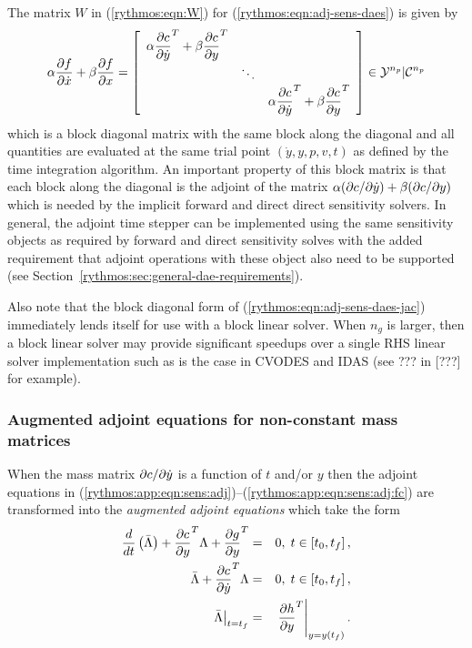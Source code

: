 \documentclass[pdf,ps2pdf,11pt]{SANDreport}
\begin{document}
The matrix $W$ in (\ref{rythmos:eqn:W}) for
(\ref{rythmos:eqn:adj-sens-daes}) is given by
%
\begin{equation}
\alpha \Jac{f}{\dot{x}} + \beta \Jac{f}{x}
= 
{\bmat{ccc}
\alpha \Jac{c}{\dot{y}}^T + \beta \Jac{c}{y}^T \\
& \ddots \\
& & \alpha \Jac{c}{\dot{y}}^T + \beta \Jac{c}{y}^T
\emat}
\in \mathcal{Y}^{n_p}|\mathcal{C}^{n_p}
\label{rythmos:eqn:adj-sens-daes-jac}
\end{equation}
%
which is a block diagonal matrix with the same block along the diagonal and
all quantities are evaluated at the same trial point $(\dot{y},y,p,v,t)$ as
defined by the time integration algorithm.  An important property of this
block matrix is that each block along the diagonal is the adjoint of the
matrix ${}\alpha (\partial c / \partial \dot{y}) + {}\beta (\partial c / \partial y)$ which is needed by
the implicit forward and direct direct sensitivity solvers.  In general, the
adjoint time stepper can be implemented using the same sensitivity objects as
required by forward and direct sensitivity solves with the added requirement
that adjoint operations with these object also need to be supported (see
Section~\ref{rythmos:sec:general-dae-requirements}).

Also note that the block diagonal form of
(\ref{rythmos:eqn:adj-sens-daes-jac}) immediately lends itself for use with a
block linear solver.  When $n_g$ is larger, then a block linear solver may
provide significant speedups over a single RHS linear solver implementation
such as is the case in CVODES and IDAS (see ??? in [???] for example).

\subsubsection{Augmented adjoint equations for non-constant mass matrices}

When the mass matrix $\partial c / \partial \dot{y}$ is a function of $t$ and/or $y$ then
the adjoint equations in
(\ref{rythmos:app:eqn:sens:adj})--(\ref{rythmos:app:eqn:sens:adj:fc}) are
transformed into the {}\textit{augmented adjoint equations} which take the
form
%
\begin{eqnarray}
\frac{d}{dt}\left( \bar{\Lambda} \right)
+  \Jac{c}{y}^T \Lambda + \Jac{g}{y}^T
& = & 0, \; t \in \left[ t_0, t_f \right],
\label{rythmos:app:eqn:sens:aug-adj-de} \\
\bar{\Lambda} + \Jac{c}{\dot{y}}^T \Lambda
& = & 0, \; t \in \left[ t_0, t_f \right],
\label{rythmos:app:eqn:sens:aug-adj-ae} \\
\left. \bar{\Lambda} \right|_{t=t_f}
& = & \left. \Jac{h}{y}^T \right|_{y=y(t_f)}.
\label{rythmos:eqn:sens:aug-adj:fc}
\end{eqnarray}
\end{document}
